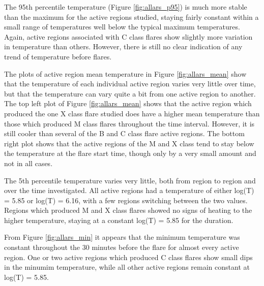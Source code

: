 \documentclass[referee,a4paper,12pt]{swsc}
\begin{document}
\begin{linenumbers}
The 95th percentile temperature (Figure \ref{fig:allars_p95}) is much more stable than the maximum for the active regions studied, staying fairly constant within a small range of temperatures well below the typical maximum temperatures.
Again, active regions associated with C class flares show slightly more variation in temperature than others.
However, there is still no clear indication of any trend of temperature before flares.

The plots of active region mean temperature in Figure \ref{fig:allars_mean} show that the temperature of each individual active region varies very little over time, but that the temperature can vary quite a bit from one active region to another.
The top left plot of Figure \ref{fig:allars_mean} shows that the active region which produced the one X class flare studied does have a higher mean temperature than those which produced M class flares throughout the time interval.
However, it is still cooler than several of the B and C class flare active regions.
The bottom right plot shows that the active regions of the M and X class tend to stay below the temperature at the flare start time, though only by a very small amount and not in all cases.

The 5th percentile temperature varies very little, both from region to region and over the time investigated.
All active regions had a temperature of either log(T) = 5.85 or log(T) = 6.16, with a few regions switching between the two values.
Regions which produced M and X class flares showed no signs of heating to the higher temperature, staying at a constant log(T) = 5.85 for the duration.

From Figure \ref{fig:allars_min} it appears that the minimum temperature was constant throughout the 30 minutes before the flare for almost every active region.
One or two active regions which produced C class flares show small dips in the minumim temperature, while all other active regions remain constant at log(T) = 5.85.


\end{linenumbers}
\end{document}
